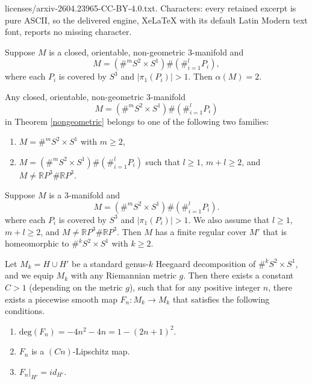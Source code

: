 \documentclass[10pt,a4paper]{amsart}
\begin{document}
licenses/arxiv-2604.23965-CC-BY-4.0.txt. Characters: every retained excerpt is pure ASCII, so the delivered engine, XeLaTeX with its default Latin Modern text font, reports no missing character.
\begin{thm}\label{nongeometric}
    Suppose $M$ is a closed, orientable, non-geometric 3-manifold and  \[
        M=(\#^mS^2\times S^1)\#(\#_{i=1}^l P_i),
    \] where each $P_i$ is covered by $S^3$ and $|\pi_1(P_i)|>1$.
  Then $\alpha(M)=2$.
    
    \end{thm}

\begin{lem}\label{classify}
Any closed, orientable, non-geometric $3$-manifold $$M=(\#^mS^2\times S^1)\#(\#_{i=1}^l P_i)$$ in Theorem \ref{nongeometric} belongs to one of the following two families:
\begin{enumerate}
\item $M=\#^mS^2\times S^1$ with $m\geq 2$,
\item $M=(\#^mS^2\times S^1)\#(\#_{i=1}^l P_i)$ such that $l\geq 1$, $m+l\geq 2$, and $M\ne \mathbb{R}P^3\#\mathbb{R}P^3$.
\end{enumerate}
\end{lem}

\begin{lem}\label{cover}
 Suppose $M$ is a 3-manifold and  \[
        M=(\#^mS^2\times S^1)\#(\#_{i=1}^l P_i).
    \] where each $P_i$ is covered by $S^3$ and $|\pi_1(P_i)|>1$. We also assume that $l\geq 1$, $m+l\geq 2$, and $M\ne \mathbb{R}P^3\# \mathbb{R}P^3$. Then $M$ has a finite regular cover $M'$ that is homeomorphic to $\#^k S^2\times S^1$ with $k\geq 2$.
 \end{lem}

\begin{thm}\label{technical}
Let $M_k=H\cup H'$ be a standard genus-$k$ Heegaard decomposition of $\#^k S^2\times S^1$, and we equip $M_k$ with any Riemannian metric $g$. Then there exists a constant $C>1$ (depending on the metric $g$), such that for any positive integer $n$, there exists a piecewise smooth map $F_n:M_k\to M_k$ that satisfies the following conditions.
\begin{enumerate}
\item $\text{deg}(F_n)=-4n^2-4n=1-(2n+1)^2$.
\item $F_n$ is a $(Cn)$-Lipschitz map.
\item $F_n|_{H'}=id_{H'}$.
\end{enumerate}
\end{thm}
\end{document}
